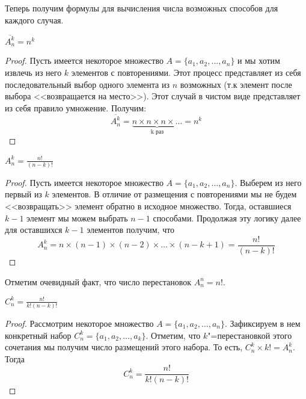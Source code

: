 Теперь получим формулы для вычисления числа возможных способов
для каждого случая.

\begin{theorem}
    $\overline{A_n^k} = n^k$
\end{theorem}

\begin{proof}
    Пусть имеется некоторое множество $A = \{a_1, a_2, \dots, a_n\}$
    и мы хотим извлечь из него $k$ элементов с повторениями. Этот процесс
    представляет из себя последовательный выбор одного элемента из $n$ возможных
    (т.к элемент после выбора <<возвращается на место>>). Этот случай
    в чистом виде представляет из себя правило умножение. Получим:
    \begin{equation*}
        \displaystyle \overline{A_n^k} = \underbrace{n \times n \times n \times \dots}_{\text{k раз}} = n^k
    \end{equation*}
\end{proof}

\begin{theorem}
    $\displaystyle A_n^k = \frac{n!}{(n - k)!}$
\end{theorem}

\begin{proof}
    Пусть имеется некоторое множество $A = \{a_1, a_2, \dots, a_n\}$.
    Выберем из него первый из $k$ элементов. В отличие от размещения с повторениями
    мы не будем <<возвращать>> элемент обратно в исходное множество.
    Тогда, оставшиеся $k - 1$ элемент мы можем выбрать $n - 1$ способами.
    Продолжая эту логику далее для оставшихся $k - 1$ элементов получим, что
    \begin{equation*}
        \displaystyle A_n^k = n \times (n - 1) \times (n - 2) \times \dots \times (n - k + 1) = \frac{n!}{(n - k)!}
    \end{equation*}
\end{proof}

Отметим очевидный факт, что число перестановок $\displaystyle A_n^n = n!$.

\begin{theorem}
    $\displaystyle C_n^k = \frac{n!}{k!(n - k)!}$
\end{theorem}

\begin{proof}
    Рассмотрим некоторое множество $A = \{a_1, a_2, \dots, a_n\}$. Зафиксируем в нем конкретный набор $C_n^k = \{a_1, a_2, \dots, a_k\}$.
    Отметим, что $k$"=перестановкой этого сочетания мы получим 
    число размещений этого набора. То есть, $C_n^k \times k! = A_n^k$.
    Тогда
    \begin{equation}
     C_n^k = \frac{n!}{k!(n - k)!}
    \end{equation} 
\end{proof}

